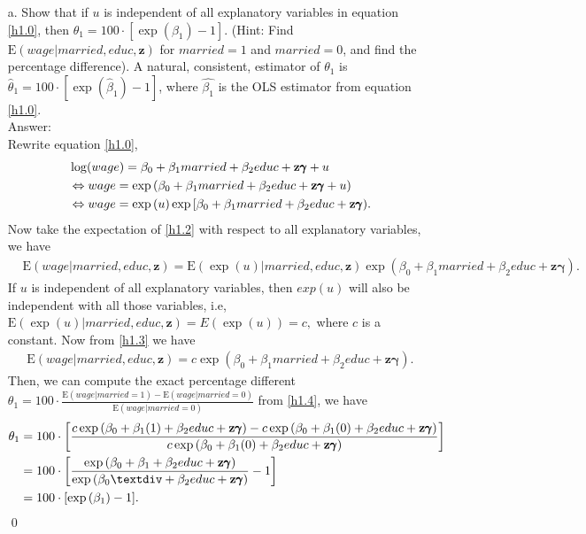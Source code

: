 \documentclass[10pt]{article}
\newcommand{\E}{\text{E}}
\begin{document}
\begin{enumerate}
\item[a.] Show that if $u$ is independent of all explanatory variables in equation \eqref{h1.0}, then $\theta_1=100\cdot[\exp(\beta_1)-1]$. (Hint: Find $\E(wage|married,educ,\mathbf{z})$ for $married=1$ and $married=0$, and find the percentage difference). A natural, consistent, estimator of $\theta_1$ is $\hat{\theta}_1=100\cdot[\exp(\hat{\beta}_1)-1]$, where $\hat{\beta_1}$ is the OLS estimator from equation \eqref{h1.0}.
\\ Answer:\\
Rewrite equation \eqref{h1.0},
\begin{align}
    &\log(wage)=\beta_0+\beta_1 married +\beta_2 educ+\mathbf{z\pmb{\gamma}}+u \notag\\
    &\Leftrightarrow wage=\exp{(\beta_0+\beta_1 married +\beta_2 educ+\mathbf{z\pmb{\gamma}}+u)} \notag\\
    &\Leftrightarrow wage=\exp{(u)}\exp{[\beta_0+\beta_1 married +\beta_2 educ+\mathbf{z\pmb{\gamma}})}. \label{h1.2}
\end{align}
Now take the expectation of \eqref{h1.2} with respect to all explanatory variables, we have
\begin{align}
    &\E(wage|married,educ,\mathbf{z})=\E(\exp{(u)}|married,educ,\mathbf{z})\exp{(\beta_0+\beta_1 married +\beta_2 educ+\mathbf{z}\pmb{\gamma})}.\label{h1.3}
\end{align}
If $u$ is independent of all explanatory variables, then $exp(u)$ will also be independent with all those variables, i.e, $\E(\exp{(u)}|married,educ,\mathbf{z})=E(\exp(u))=c,$ where $c$ is a constant. Now from \eqref{h1.3} we have
\begin{align}
    \E(wage|married,educ,\mathbf{z})=c\exp{(\beta_0+\beta_1 married +\beta_2 educ+\mathbf{z}\pmb{\gamma})}. \label{h1.4}
\end{align}
Then, we can compute the exact percentage different $\theta_1=100\cdot\frac{\E(wage|married=1)-\E(wage|married=0)}{\E(wage|married=0)}$ from \eqref{h1.4}, we have
\begin{align}
    \theta_1&=100\cdot\left[\frac{c\exp{(\beta_0+\beta_1 (1) +\beta_2 educ+\mathbf{z}\pmb{\gamma})}-c\exp{(\beta_0+\beta_1 (0) +\beta_2 educ+\mathbf{z}\pmb{\gamma})}}{c\exp{(\beta_0+\beta_1 (0) +\beta_2 educ+\mathbf{z}\pmb{\gamma})}}\right] \notag \\
    &=100\cdot\left[\frac{\exp{(\beta_0+\beta_1 +\beta_2 educ+\mathbf{z}\pmb{\gamma})}}{\exp{(\beta_0÷ +\beta_2 educ+\mathbf{z}\pmb{\gamma})}}-1\right] \notag \\
    &=100\cdot[\exp{(\beta_1)}-1]. \notag
\end{align} \qed


\end{enumerate}
\end{document}

